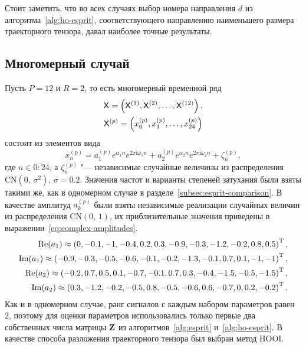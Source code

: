 \documentclass[specialist,
  substylefile=spbu_report.rtx,
subf,href,colorlinks=true, 12pt]{disser}
\theoremstyle{plain}
\theoremstyle{definition}
\theoremstyle{remark}
\newcommand{\iu}{\mathrm{i}}
\begin{document}
Стоит заметить, что во всех случаях выбор номера направления $d$ из
алгоритма~\ref{alg:ho-esprit}, соответствующего направлению
наименьшего размера
траекторного тензора, давал наиболее точные результаты.

\subsection{Многомерный случай}\label{subsec:mv-esprit-comparison}
Пусть $P=12$ и $R=2$, то есть многомерный временной ряд
\begin{gather*}
  \mathsf{X} = \left(\mathsf{X}^{(1)}, \mathsf{X}^{(2)}, \ldots, \mathsf{X}^{(12)}\right),\\
  \mathsf{X}^{(p)} = \left(x_0^{(p)}, x_1^{(p)}, \ldots, x_{24}^{(p)}\right)
\end{gather*}
состоит из элементов вида
\[
  x_n^{(p)} = a_1^{(p)} e^{ \alpha_1 n }
  e^{2 \pi \iu \omega_1 n} +
  a_2^{(p)} e^{ \alpha_2 n }
  e^{2 \pi \iu \omega_2 n} + \zeta_n^{(p)},
\]
где $n \in \overline{0:24}$, а $\zeta_n^{(p)}$ "--- независимые
случайные величины из
распределения $\mathrm{CN}(0,\, \sigma^2)$, $\sigma=0.2$.
Значения частот и варианты степеней затухания были взяты такими же, как
в одномерном случае в разделе~\ref{subsec:esprit-comparison}.
В качестве амплитуд $a_k^{(p)}$ были взяты независимые реализации
случайных величин из распределения $\mathrm{CN}(0,\, 1)$,
их приблизительные значения приведены в
выражении~\eqref{eq:complex-amplitudes}.
\begin{gather}
  \label{eq:complex-amplitudes}
  \begin{split}
    \operatorname{Re}(a_1) \approx \left( 0, -0.1, -1, -0.4, 0.2,
    0.3, -0.9, -0.3, -1.2, -0.2, 0.8, 0.5\right)^{\mathrm{T}}, \\
    \operatorname{Im}(a_1) \approx \left(-0.9, -0.3, -0.5, -0.6,
    -0.1, -0.2, -1.3, -0.1, 0.7, 0.1, -1, -1 \right)^{\mathrm{T}}, \\
    \operatorname{Re}(a_2) \approx \left( -0.2, 0.7, 0.5, 0.1, -0.7,
    -0.1, 0.7, 0.3, -0.4, -1.5, -0.5, -1.5\right)^{\mathrm{T}}, \\
    \operatorname{Im}(a_2) \approx \left( 0.3, -1.2, -0.2, -0.5, 0.8,
    -0.5, -0.6, 0.6, -0.7, 0, 0.2, -0.2\right)^{\mathrm{T}}. \\
  \end{split}
\end{gather}
Как и в одномерном случае, ранг сигналов с каждым набором параметров равен 2,
поэтому для оценки параметров использовались только первые два собственных
числа матрицы $\mathbf{Z}$ из алгоритмов~\ref{alg:esprit} и~\ref{alg:ho-esprit}.
В качестве способа разложения траекторного тензора был выбран метод HOOI.
\end{document}
